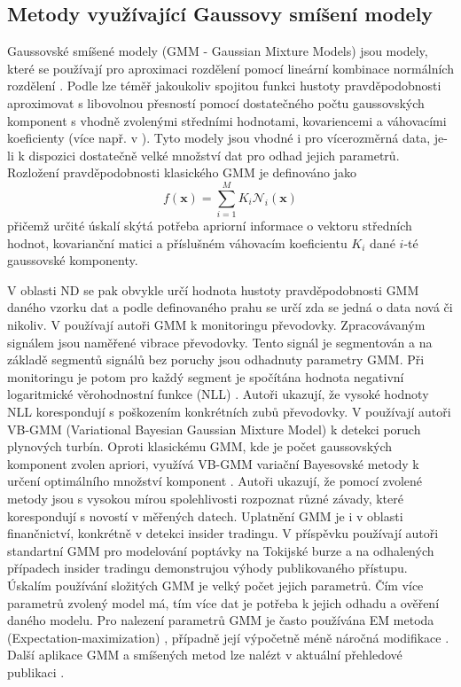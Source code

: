 \subsection{Metody využívající Gaussovy smíšení modely}
Gaussovské smíšené modely (GMM - Gaussian Mixture Models) jsou modely, které se používají pro aproximaci rozdělení pomocí lineární kombinace normálních  rozdělení \cite{gmm1}. Podle \cite{gmm2} lze téměř jakoukoliv spojitou funkci hustoty pravděpodobnosti aproximovat s libovolnou přesností pomocí dostatečného počtu gaussovských komponent s vhodně zvolenými středními hodnotami, kovariencemi a váhovacími koeficienty (více např. v \cite{gmm3,gmm4}). Tyto modely jsou vhodné i pro vícerozměrná data, je-li k dispozici dostatečně velké množství dat pro odhad jejich parametrů. Rozložení pravděpodobnosti klasického GMM je definováno jako
\begin{equation}
f(\textbf{x})=\sum_{i=1}^M K_i\mathcal{N}_i(\textbf{x})
\end{equation}
přičemž určité úskalí skýtá potřeba apriorní informace o vektoru středních hodnot, kovarianční matici a příslušném váhovacím koeficientu $K_i$ dané $i$-té gaussovské komponenty. 
\par V oblasti ND se pak obvykle určí hodnota hustoty pravděpodobnosti GMM daného vzorku dat a podle definovaného prahu se určí zda se jedná o data nová či nikoliv.  V \cite{gmm2} používají autoři GMM k monitoringu převodovky. Zpracovávaným signálem jsou naměřené vibrace převodovky. Tento signál je segmentován a na základě segmentů signálů bez poruchy jsou odhadnuty parametry GMM. Při monitoringu je potom pro každý segment je spočítána hodnota negativní logaritmické věrohodnostní funkce (NLL) \cite{gmm5}. Autoři ukazují, že vysoké hodnoty NLL korespondují s poškozením konkrétních zubů převodovky. V \cite{gmm6} používají autoři VB-GMM (Variational Bayesian Gaussian Mixture Model) k detekci poruch plynových turbín. Oproti klasickému GMM, kde je počet gaussovských komponent zvolen apriori, využívá VB-GMM variační Bayesovské metody k určení optimálního množství komponent \cite{gmm7}. Autoři ukazují, že pomocí zvolené metody jsou s vysokou mírou spolehlivosti rozpoznat různé závady, které korespondují s novostí v měřených datech. Uplatnění GMM je i v oblasti finančnictví, konkrétně v detekci insider tradingu. V příspěvku \cite{gmm8} používají autoři standartní GMM pro modelování poptávky na Tokijské burze a na odhalených případech insider tradingu demonstrujou výhody publikovaného přístupu. Úskalím používání složitých GMM je velký počet jejich parametrů. Čím více parametrů zvolený model má, tím více dat je potřeba k jejich odhadu a ověření daného modelu. Pro nalezení parametrů GMM je často používána EM metoda (Expectation-maximization) \cite{gmm9}, případně její výpočetně méně náročná modifikace \cite{gmm10}. Další aplikace GMM a smíšených metod lze nalézt v aktuální přehledové publikaci \cite{gmm11}.

